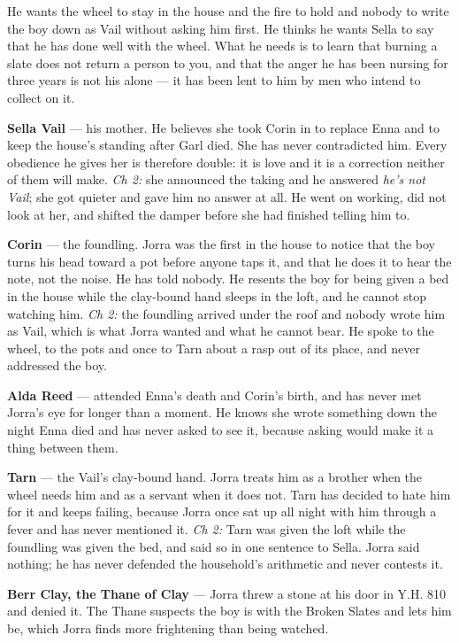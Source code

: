 \documentclass{design/chronicle}
\begin{document}
{
He wants the wheel to stay in the house and the fire to hold and nobody to write the boy down as Vail without asking him first. He thinks he wants Sella to say that he has done well with the wheel. What he needs is to learn that burning a slate does not return a person to you, and that the anger he has been nursing for three years is not his alone — it has been lent to him by men who intend to collect on it.

\textbf{Sella Vail} — his mother. He believes she took Corin in to replace Enna and to keep the house’s standing after Garl died. She has never contradicted him. Every obedience he gives her is therefore double: it is love and it is a correction neither of them will make. \emph{Ch 2:} she announced the taking and he answered \emph{he’s not Vail}; she got quieter and gave him no answer at all. He went on working, did not look at her, and shifted the damper before she had finished telling him to.

\textbf{Corin} — the foundling. Jorra was the first in the house to notice that the boy turns his head toward a pot before anyone taps it, and that he does it to hear the note, not the noise. He has told nobody. He resents the boy for being given a bed in the house while the clay-bound hand sleeps in the loft, and he cannot stop watching him. \emph{Ch 2:} the foundling arrived under the roof and nobody wrote him as Vail, which is what Jorra wanted and what he cannot bear. He spoke to the wheel, to the pots and once to Tarn about a rasp out of its place, and never addressed the boy.

\textbf{Alda Reed} — attended Enna’s death and Corin’s birth, and has never met Jorra’s eye for longer than a moment. He knows she wrote something down the night Enna died and has never asked to see it, because asking would make it a thing between them.

\textbf{Tarn} — the Vail’s clay-bound hand. Jorra treats him as a brother when the wheel needs him and as a servant when it does not. Tarn has decided to hate him for it and keeps failing, because Jorra once sat up all night with him through a fever and has never mentioned it. \emph{Ch 2:} Tarn was given the loft while the foundling was given the bed, and said so in one sentence to Sella. Jorra said nothing; he has never defended the household’s arithmetic and never contests it.

\textbf{Berr Clay, the Thane of Clay} — Jorra threw a stone at his door in Y.H. 810 and denied it. The Thane suspects the boy is with the Broken Slates and lets him be, which Jorra finds more frightening than being watched.

}
\end{document}
